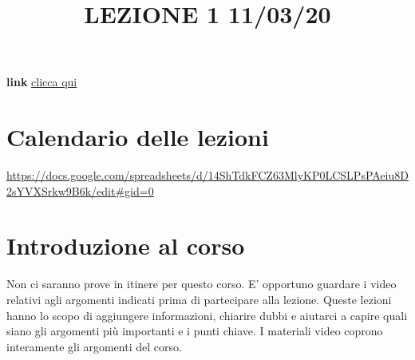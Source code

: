 \title{LEZIONE 1 11/03/20}\newline
\textbf{link} \href{https://web.microsoftstream.com/video/58568b1d-5fc5-41c0-88f6-608e4b8f9f7a}{clicca qui}
\section{Calendario delle lezioni}
\url{https://docs.google.com/spreadsheets/d/14ShTdkFCZ63MlyKP0LCSLPsPAeiu8D2sYVXSrkw9B6k/edit#gid=0}
\section{Introduzione al corso}
Non ci saranno prove in itinere per questo corso.\newline
E' opportuno guardare i video relativi agli argomenti indicati prima di partecipare alla lezione.\newline
Queste lezioni hanno lo scopo di aggiungere informazioni, chiarire dubbi e aiutarci a capire quali siano gli argomenti più importanti e i punti chiave.\newline
I materiali video coprono interamente gli argomenti del corso.
